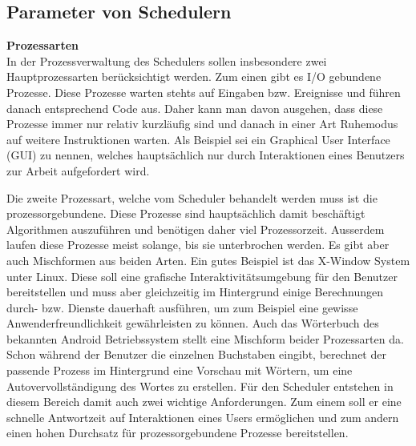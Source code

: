 \subsection{Parameter von Schedulern}
\textbf{Prozessarten}\\
In der Prozessverwaltung des Schedulers sollen insbesondere zwei Hauptprozessarten berücksichtigt werden. Zum einen gibt es I/O gebundene Prozesse. Diese Prozesse warten stehts auf Eingaben bzw. Ereignisse und führen danach entsprechend Code aus. Daher kann man davon ausgehen, dass diese Prozesse immer nur relativ kurzläufig sind und danach in einer Art Ruhemodus auf weitere Instruktionen warten. Als Beispiel sei ein Graphical User Interface (GUI) zu nennen, welches hauptsächlich nur durch Interaktionen eines Benutzers zur Arbeit aufgefordert wird.

Die zweite Prozessart, welche vom Scheduler behandelt werden muss ist die prozessorgebundene. Diese Prozesse sind hauptsächlich damit beschäftigt Algorithmen auszuführen und be\-nötigen daher viel Prozessorzeit. Ausserdem laufen diese Prozesse meist solange, bis sie unterbrochen werden.
Es gibt aber auch Mischformen aus beiden Arten. Ein gutes Beispiel ist das X-Window System unter Linux. Diese soll eine grafische Interaktivitätsumgebung für den Benutzer bereitstellen und muss aber gleichzeitig im Hintergrund einige Berechnungen durch- bzw. Dienste dauerhaft ausführen, um zum Beispiel eine gewisse Anwenderfreundlichkeit gewähr\-leis\-ten zu können. 
Auch das Wörterbuch des bekannten Android Betriebssystem stellt eine Mischform beider Prozessarten da. Schon während der Benutzer die einzelnen Buchstaben eingibt, berechnet der passende Prozess im Hintergrund eine Vorschau mit Wörtern, um eine Auto\-ver\-voll\-ständigung des Wortes zu erstellen.
Für den Scheduler entstehen in diesem Bereich damit auch zwei wichtige Anforderungen. Zum einem soll er eine schnelle Antwortzeit auf Interaktionen eines Users ermöglichen und zum andern einen hohen Durchsatz für prozessorgebundene Prozesse bereitstellen.

